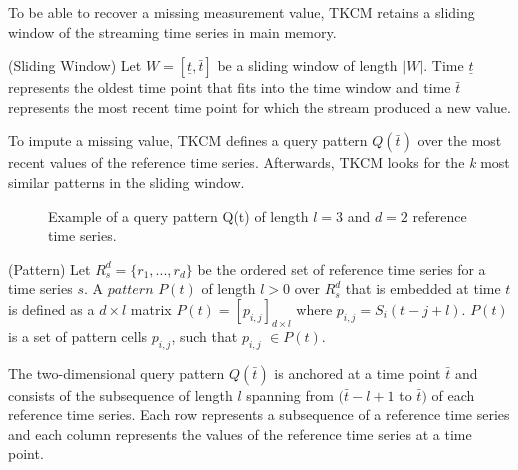 \documentclass[abstracton,12pt,oneside]{scrreprt}
\begin{document}
To be able to recover a missing measurement value, TKCM retains a sliding window of the streaming time series in main memory. 

\begin{defn}
	(Sliding Window) Let $W=[ \underline{t}, \bar{t} ]$ be a sliding window of length $|W|$. Time $\underline{t}$ represents the oldest time point that fits into the time window and time $\bar{t}$ represents the most recent time point for which the stream produced a new value. 
\end{defn}
To impute a missing value, TKCM defines a query pattern $Q(\bar{t})$ over the most recent values of the reference time series. Afterwards, TKCM looks for the \emph{k} most similar patterns in the sliding window.  
\begin{figure}[H]
	\centering
	\caption{Example of a query pattern Q(t) of length $l=3$ and $d=2$ reference time series.}
\end{figure}
\begin{defn}
	(Pattern) Let $R_s^d=\{r_1,...,r_d\}$ be the ordered set of reference time series for a time series $s$. A $pattern$ $P(t)$ of length $l > 0$ over $R_s^d$ that is embedded at time $t$ is defined as a $d\times l$ matrix $P(t) = [p_{i,j}]_{d\times l}$ where $p_{i,j}=S_i(t-j+l)$. $P(t)$ is a set of pattern cells $p_{i,j}$, such that $p_{i,j}$ $\in P(t)$. 
\end{defn}
The two-dimensional query pattern $Q(\bar{t})$ is anchored at a time point $\bar{t}$ and consists of the subsequence of length $l$ spanning from $(\bar{t}-l+1$ to $\bar{t})$ of each reference time series. Each row represents a subsequence of a reference time series and each column represents the values of the reference time series at a time point.\\ 
\end{document}
